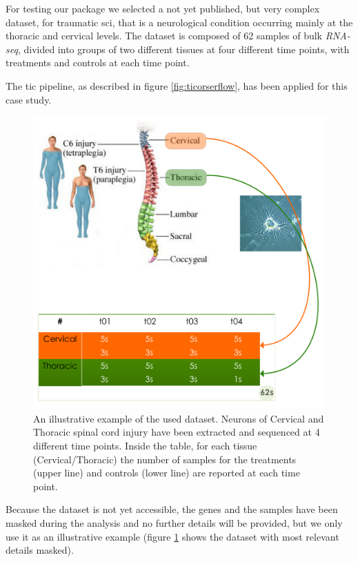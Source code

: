 For testing our package we selected a not yet published, but very complex dataset, for traumatic \gls{sci}, that is a neurological condition occurring mainly at the thoracic and cervical levels.
The dataset is composed of 62 samples of bulk \textit{RNA-seq}, divided into groups of two different tissues at four different time points, with treatments and controls at each time point.

The \gls{tic} pipeline, as described in figure \ref{fig:ticorserflow}, has been applied for this case study.

\begin{figure}[H]
\centering
\includegraphics[width=\textwidth, keepaspectratio]{img/ticorser/dataset.pdf}
\caption[ticorser dataset]{An illustrative example of the used dataset. Neurons of Cervical and Thoracic spinal cord injury have been extracted and sequenced at 4 different time points. Inside the table, for each tissue (Cervical/Thoracic) the number of samples for the treatments (upper line) and controls (lower line) are reported at each time point.}
\label{fig:ticorserdataset}

\end{figure}

Because the dataset is not yet accessible, the genes and the samples have been masked during the analysis and no further details will be provided, but we only use it as an illustrative example (figure \ref{fig:ticorserdataset} shows the dataset with most relevant details masked).

